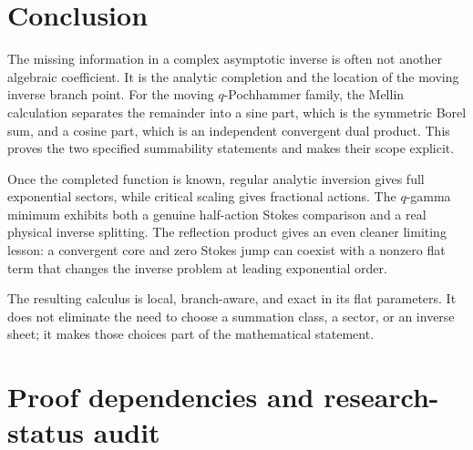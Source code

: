 \documentclass[11pt,a4paper]{article}
\numberwithin{equation}{section}
\theoremstyle{definition}
\theoremstyle{remark}\newtheorem{remark}[theorem]{Remark}
\begin{document}
\section{Conclusion}
The missing information in a complex asymptotic inverse is often not
another algebraic coefficient. It is the analytic completion and the
location of the moving inverse branch point. For the moving
$q$-Pochhammer family, the Mellin calculation separates the remainder
into a sine part, which is the symmetric Borel sum, and a cosine part,
which is an independent convergent dual product. This proves the two
specified summability statements and makes their scope explicit.

Once the completed function is known, regular analytic inversion gives
full exponential sectors, while critical scaling gives fractional
actions. The $q$-gamma minimum exhibits both a genuine half-action
Stokes comparison and a real physical inverse splitting. The reflection
product gives an even cleaner limiting lesson: a convergent core and
zero Stokes jump can coexist with a nonzero flat term that changes the
inverse problem at leading exponential order.

The resulting calculus is local, branch-aware, and exact in its flat
parameters. It does not eliminate the need to choose a summation class,
a sector, or an inverse sheet; it makes those choices part of the
mathematical statement.

\appendix
\section{Proof dependencies and research-status audit}
\label{app:audit}
\end{document}
